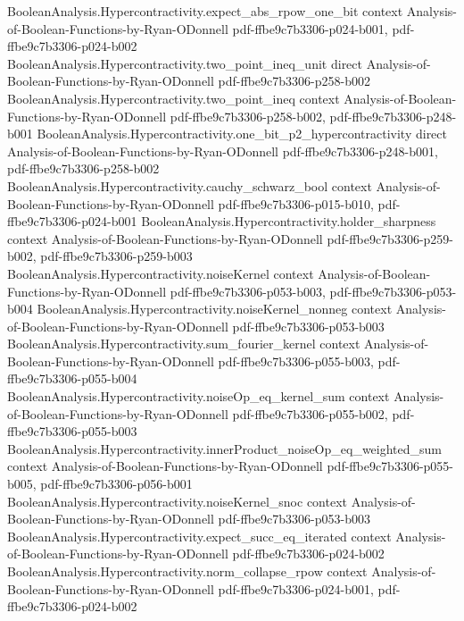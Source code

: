 \begin{theorem}
\proofstep
  {BooleanAnalysis.Hypercontractivity.expect_abs_rpow_one_bit}
  {context}
  {Analysis-of-Boolean-Functions-by-Ryan-ODonnell}
  {pdf-ffbe9c7b3306-p024-b001,
    pdf-ffbe9c7b3306-p024-b002}
\proofstep
  {BooleanAnalysis.Hypercontractivity.two_point_ineq_unit}
  {direct}
  {Analysis-of-Boolean-Functions-by-Ryan-ODonnell}
  {pdf-ffbe9c7b3306-p258-b002}
\proofstep
  {BooleanAnalysis.Hypercontractivity.two_point_ineq}
  {context}
  {Analysis-of-Boolean-Functions-by-Ryan-ODonnell}
  {pdf-ffbe9c7b3306-p258-b002,
    pdf-ffbe9c7b3306-p248-b001}
\proofstep
  {BooleanAnalysis.Hypercontractivity.one_bit_p2_hypercontractivity}
  {direct}
  {Analysis-of-Boolean-Functions-by-Ryan-ODonnell}
  {pdf-ffbe9c7b3306-p248-b001,
    pdf-ffbe9c7b3306-p258-b002}
\proofstep
  {BooleanAnalysis.Hypercontractivity.cauchy_schwarz_bool}
  {context}
  {Analysis-of-Boolean-Functions-by-Ryan-ODonnell}
  {pdf-ffbe9c7b3306-p015-b010,
    pdf-ffbe9c7b3306-p024-b001}
\proofstep
  {BooleanAnalysis.Hypercontractivity.holder_sharpness}
  {context}
  {Analysis-of-Boolean-Functions-by-Ryan-ODonnell}
  {pdf-ffbe9c7b3306-p259-b002,
    pdf-ffbe9c7b3306-p259-b003}
\proofstep
  {BooleanAnalysis.Hypercontractivity.noiseKernel}
  {context}
  {Analysis-of-Boolean-Functions-by-Ryan-ODonnell}
  {pdf-ffbe9c7b3306-p053-b003,
    pdf-ffbe9c7b3306-p053-b004}
\proofstep
  {BooleanAnalysis.Hypercontractivity.noiseKernel_nonneg}
  {context}
  {Analysis-of-Boolean-Functions-by-Ryan-ODonnell}
  {pdf-ffbe9c7b3306-p053-b003}
\proofstep
  {BooleanAnalysis.Hypercontractivity.sum_fourier_kernel}
  {context}
  {Analysis-of-Boolean-Functions-by-Ryan-ODonnell}
  {pdf-ffbe9c7b3306-p055-b003,
    pdf-ffbe9c7b3306-p055-b004}
\proofstep
  {BooleanAnalysis.Hypercontractivity.noiseOp_eq_kernel_sum}
  {context}
  {Analysis-of-Boolean-Functions-by-Ryan-ODonnell}
  {pdf-ffbe9c7b3306-p055-b002,
    pdf-ffbe9c7b3306-p055-b003}
\proofstep
  {BooleanAnalysis.Hypercontractivity.innerProduct_noiseOp_eq_weighted_sum}
  {context}
  {Analysis-of-Boolean-Functions-by-Ryan-ODonnell}
  {pdf-ffbe9c7b3306-p055-b005,
    pdf-ffbe9c7b3306-p056-b001}
\proofstep
  {BooleanAnalysis.Hypercontractivity.noiseKernel_snoc}
  {context}
  {Analysis-of-Boolean-Functions-by-Ryan-ODonnell}
  {pdf-ffbe9c7b3306-p053-b003}
\proofstep
  {BooleanAnalysis.Hypercontractivity.expect_succ_eq_iterated}
  {context}
  {Analysis-of-Boolean-Functions-by-Ryan-ODonnell}
  {pdf-ffbe9c7b3306-p024-b002}
\proofstep
  {BooleanAnalysis.Hypercontractivity.norm_collapse_rpow}
  {context}
  {Analysis-of-Boolean-Functions-by-Ryan-ODonnell}
  {pdf-ffbe9c7b3306-p024-b001,
    pdf-ffbe9c7b3306-p024-b002}

\end{theorem}
